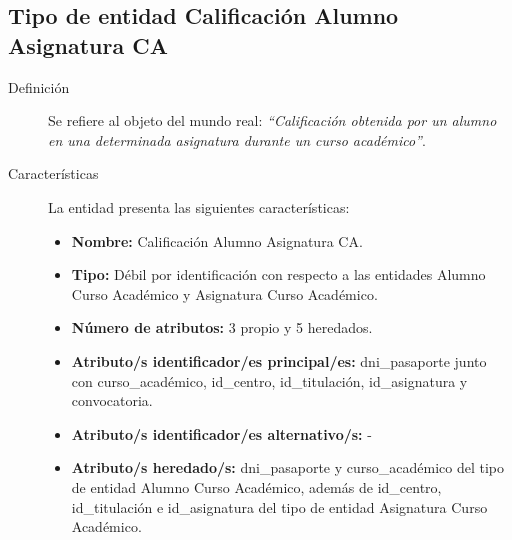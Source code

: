 \subsection{Tipo de entidad Calificación Alumno Asignatura CA}

   \begin{description}

   \item[Definición] Se refiere al objeto del mundo real: \emph{``Calificación
   obtenida por un alumno en una determinada asignatura durante un curso
   académico''}.

   \item[Características] La entidad presenta las siguientes características:
      \begin{itemize}
         \item \textbf{Nombre:} Calificación Alumno Asignatura CA.
         \item \textbf{Tipo:} Débil por identificación con respecto a las
         entidades Alumno Curso Académico y Asignatura Curso Académico.
         \item \textbf{Número de atributos:} 3 propio y 5 heredados.
         \item \textbf{Atributo/s identificador/es principal/es:} dni\_pasaporte
         junto con curso\_académico, id\_centro, id\_titulación, id\_asignatura
         y convocatoria.
         \item \textbf{Atributo/s identificador/es alternativo/s:} -
         \item \textbf{Atributo/s heredado/s:} dni\_pasaporte y curso\_académico del tipo de entidad Alumno Curso Académico, además de id\_centro, id\_titulación
         e id\_asignatura del tipo de entidad Asignatura Curso Académico.
      \end{itemize}


\end{description}
